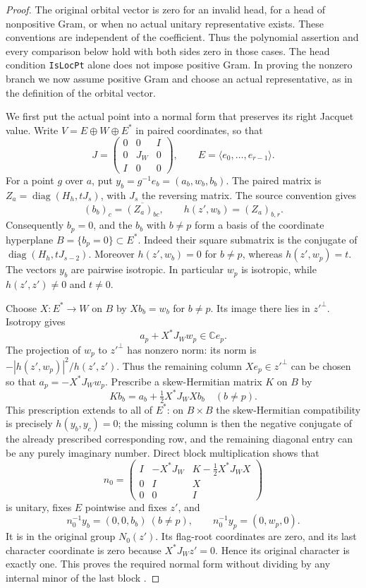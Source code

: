 \begin{proof}
The original orbital vector is zero for an invalid head, for a
head of nonpositive Gram, or when no actual unitary representative
exists.  These conventions are independent of the coefficient.
Thus the polynomial assertion and every comparison below hold
with both sides zero in those cases.  The head condition
\texttt{IsLocPt} alone does not impose positive Gram.  In proving
the nonzero branch we now assume positive Gram and choose an
actual representative, as in the definition of the orbital vector.

We first put the actual point into a normal form that preserves its
right Jacquet value.  Write $V=E\oplus W\oplus E^*$ in paired
coordinates, so that
\[
 J=\begin{pmatrix}0&0&I\\0&J_W&0\\I&0&0\end{pmatrix},
 \qquad E=\langle e_0,\ldots,e_{r-1}\rangle.
\]
For a point $g$ over $a$, put $y_b=g^{-1}e_b=(a_b,w_b,b_b)$.
The paired matrix is
$Z_a=\operatorname{diag}(H_h,tJ_s)$, with $J_s$ the reversing
matrix.  The source convention gives
\[
       (b_b)_c=\overline{(Z_a)_{bc}},\qquad
       h(z',w_b)=(Z_a)_{b,r}.
\]
Consequently $b_p=0$, and the $b_b$ with $b\ne p$ form a basis
of the coordinate hyperplane $B=\{b_p=0\}\subset E^*$.
Indeed their square submatrix is the conjugate of
$\operatorname{diag}(H_h,tJ_{s-2})$.  Moreover
$h(z',w_b)=0$ for $b\ne p$, whereas $h(z',w_p)=t$.
The vectors $y_b$ are pairwise isotropic.  In particular $w_p$
is isotropic, while $h(z',z')\ne0$ and $t\ne0$.

Choose $X:E^*\to W$ on $B$ by $Xb_b=w_b$ for $b\ne p$.
Its image there lies in $z'^\perp$.  Isotropy gives
\[
        a_p+X^*J_Ww_p\in\mathbb C e_p.
\]
The projection of $w_p$ to $z'^\perp$ has nonzero norm:
its norm is $-|h(z',w_p)|^2/h(z',z')$.  Thus the remaining
column $Xe_p\in z'^\perp$ can be chosen so that
$a_p=-X^*J_Ww_p$.  Prescribe a skew-Hermitian matrix $K$ on $B$ by
\[
             Kb_b=a_b+\tfrac12X^*J_WXb_b \quad(b\ne p).
\]
This prescription extends to all of $E^*$: on $B\times B$
the skew-Hermitian compatibility is precisely
$h(y_b,y_c)=0$; the missing column is then the negative conjugate
of the already prescribed corresponding row, and the remaining
diagonal entry can be any purely imaginary number.  Direct block
multiplication shows that
\begin{equation}\label{terminal-degree-n0}
 n_0=\begin{pmatrix}
 I&-X^*J_W&K-\tfrac12X^*J_WX\\0&I&X\\0&0&I
 \end{pmatrix}
\end{equation}
is unitary, fixes $E$ pointwise and fixes $z'$, and
\[
 n_0^{-1}y_b=(0,0,b_b)\ (b\ne p),\qquad
 n_0^{-1}y_p=(0,w_p,0).
\]
It is in the original group $N_0(z')$.  Its flag-root coordinates
are zero, and its last character coordinate is zero because
$X^*J_Wz'=0$.  Hence its original character is exactly one.
This proves the required normal form without dividing by any
internal minor of the last block \cite{terminal-degree-source}.


\end{proof}
